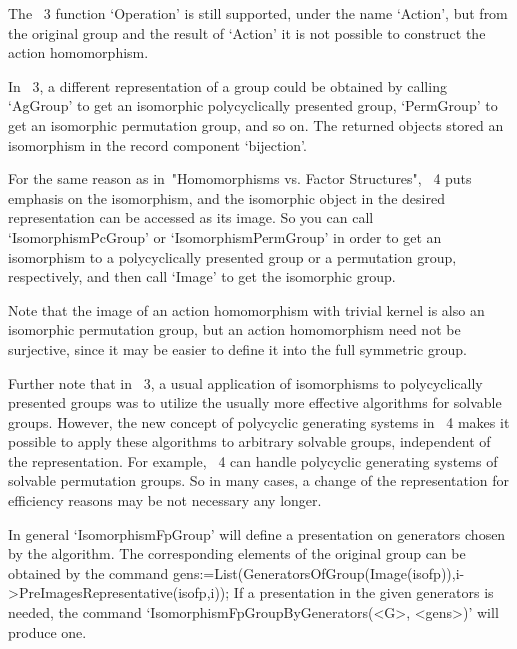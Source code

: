 The {\GAP}~3 function `Operation' is still supported, under the name `Action',
but from the original group and the result of `Action' it is not
possible to construct the action homomorphism.



In {\GAP}~3, a different representation of a group could be obtained by
calling `AgGroup' to get an isomorphic polycyclically presented group,
`PermGroup' to get an isomorphic permutation group, and so on.
The returned objects stored an isomorphism in the record component
`bijection'.

For the same reason as in~"Homomorphisms vs. Factor Structures",
{\GAP}~4 puts emphasis on the isomorphism,
and the isomorphic object in the desired representation can be accessed
as its image.
So you can call `IsomorphismPcGroup' or `IsomorphismPermGroup' in order
to get an isomorphism to a polycyclically presented group or a
permutation group, respectively, and then call `Image' to get the
isomorphic group.

Note that the image of an action homomorphism with trivial kernel is
also an isomorphic permutation group, but an action homomorphism need
not be surjective, since it may be easier to define it into the full
symmetric group.

Further note that in {\GAP}~3, a usual application of isomorphisms to
polycyclically presented groups was to utilize the usually more
effective algorithms for solvable groups.  However, the new concept of
polycyclic generating systems in {\GAP}~4 makes it possible to apply
these algorithms to arbitrary solvable groups, independent of the
representation.  For example, {\GAP}~4 can handle polycyclic
generating systems of solvable permutation groups.  So in many cases,
a change of the representation for efficiency reasons may be not
necessary any longer.

In general `IsomorphismFpGroup' will define a presentation on generators
chosen by the algorithm. The corresponding elements of the original
group can be obtained by the command
\begintt
gens:=List(GeneratorsOfGroup(Image(isofp)),i->PreImagesRepresentative(isofp,i));
\endtt
If a presentation in the given generators is needed, the command
`IsomorphismFpGroupByGenerators(<G>, <gens>)' will produce one.



